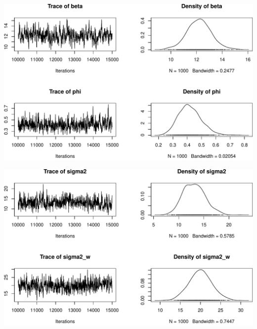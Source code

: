 \documentclass[11pt,ignorenonframetext,]{beamer}
\begin{document}
\begin{frame}{}

\includegraphics{Lec20_files/figure-beamer/unnamed-chunk-29-1.pdf}

\end{frame}

\begin{frame}{}

\includegraphics{Lec20_files/figure-beamer/unnamed-chunk-30-1.pdf}

\end{frame}
\end{document}
